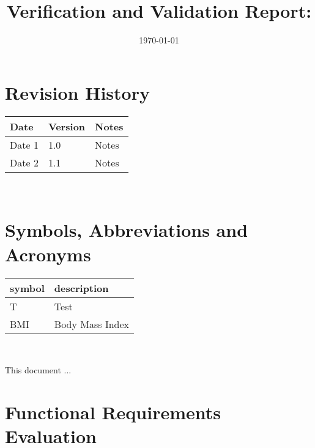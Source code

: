 \documentclass[12pt, titlepage]{article}
\begin{document}
	
	\title{Verification and Validation Report: \progname} 
	\author{\authname}
	\date{\today}
	
	\maketitle
	
	
	\section{Revision History}
	
	\begin{tabularx}{\textwidth}{p{3cm}p{2cm}X}
		\toprule {\bf Date} & {\bf Version} & {\bf Notes}\\
		\midrule
		Date 1 & 1.0 & Notes\\
		Date 2 & 1.1 & Notes\\
		\bottomrule
	\end{tabularx}
	
	~\newpage
	
	\section{Symbols, Abbreviations and Acronyms}
	
	\renewcommand{\arraystretch}{1.2}
	\begin{tabular}{l l} 
		\toprule		
		\textbf{symbol} & \textbf{description}\\
		\midrule 
		T & Test\\
		BMI & Body Mass Index\\
		\bottomrule
	\end{tabular}\\
	
	
	\newpage
	
	\tableofcontents
	
	\listoftables %
	
	\listoffigures %
	
	\newpage
	
	
	This document ...
	
	\section{Functional Requirements Evaluation}
\end{document}

